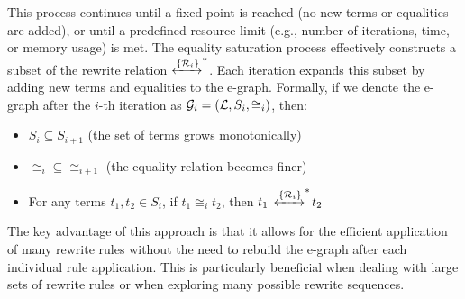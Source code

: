 This process continues until a fixed point is reached (no new terms or equalities are added), or until a predefined resource limit (e.g., number of iterations, time, or memory usage) is met.
The equality saturation process effectively constructs a subset of the rewrite relation $\xleftrightarrow[]{\{\mathcal{R}_i\}}^*$. 
Each iteration expands this subset by adding new terms and equalities to the e-graph.
Formally, if we denote the e-graph after the $i$-th iteration as $\mathcal{G}_i = (\mathcal{L}, S_i, \cong_i)$, then:

\begin{itemize}
    \item $S_i \subseteq S_{i+1}$ (the set of terms grows monotonically)
    \item $\mathcal{\cong}_i \subseteq \mathcal{\cong}_{i+1}$ (the equality relation becomes finer)
    \item For any terms $t_1, t_2 \in S_i$, if $t_1 \mathcal{\cong}_i t_2$, then $t_1 {} \,\xleftrightarrow[]{\{\mathcal{R}_i\}}^*\! {t}_2$
\end{itemize}

The key advantage of this approach is that it allows for the efficient application of many rewrite rules without the need to rebuild the e-graph after each individual rule application. This is particularly beneficial when dealing with large sets of rewrite rules or when exploring many possible rewrite sequences.

